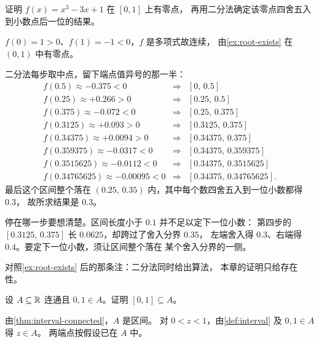 \begin{exercise}[例行]
  \label{exr:bisection}
  证明 \(f(x) = x^{3}-3x+1\) 在 \([0,1]\) 上有零点，
  再用二分法确定该零点四舍五入到小数点后一位的结果。
  \begin{solution}
    \(f(0)=1>0\)、\(f(1)=-1<0\)，\(f\) 是多项式故连续，
    由\cref{ex:root-exists} 在 \((0,1)\) 中有零点。

    二分法每步取中点，留下端点值异号的那一半：
    \[
      \begin{array}{lll}
        f(0.5)\approx-0.375<0 & \Rightarrow & [0,\,0.5] \\
        f(0.25)\approx+0.266>0 & \Rightarrow & [0.25,\,0.5] \\
        f(0.375)\approx-0.072<0 & \Rightarrow & [0.25,\,0.375] \\
        f(0.3125)\approx+0.093>0 & \Rightarrow & [0.3125,\,0.375] \\
        f(0.34375)\approx+0.0094>0 & \Rightarrow & [0.34375,\,0.375] \\
        f(0.359375)\approx-0.0317<0 & \Rightarrow & [0.34375,\,0.359375] \\
        f(0.3515625)\approx-0.0112<0 & \Rightarrow & [0.34375,\,0.3515625] \\
        f(0.34765625)\approx-0.00095<0 & \Rightarrow & [0.34375,\,0.34765625] .
      \end{array}
    \]
    最后这个区间整个落在 \((0.25,\,0.35)\) 内，其中每个数四舍五入到一位小数都得 \(0.3\)，
    故所求结果是 \(0.3\)。

    停在哪一步要想清楚。区间长度小于 \(0.1\) 并不足以定下一位小数：
    第四步的 \([0.3125,\,0.375]\) 长 \(0.0625\)，却跨过了舍入分界 \(0.35\)，
    左端舍入得 \(0.3\)、右端得 \(0.4\)。要定下一位小数，须让区间整个落在
    某个舍入分界的一侧。

    对照\cref{ex:root-exists} 后的那条注：二分法同时给出算法，
    本章的证明只给存在性。
  \end{solution}
\end{exercise}

\begin{exercise}[例行]
  \label{exr:connected-contains-interval}
  设 \(A \subseteq \mathbb{R}\) 连通且 \(0,1 \in A\)。证明 \([0,1] \subseteq A\)。
  \begin{solution}
    由\cref{thm:interval-connected}，\(A\) 是区间。
    对 \(0<z<1\)，由\cref{def:interval} 及 \(0,1 \in A\) 得 \(z \in A\)。
    两端点按假设已在 \(A\) 中。
  \end{solution}
\end{exercise}

